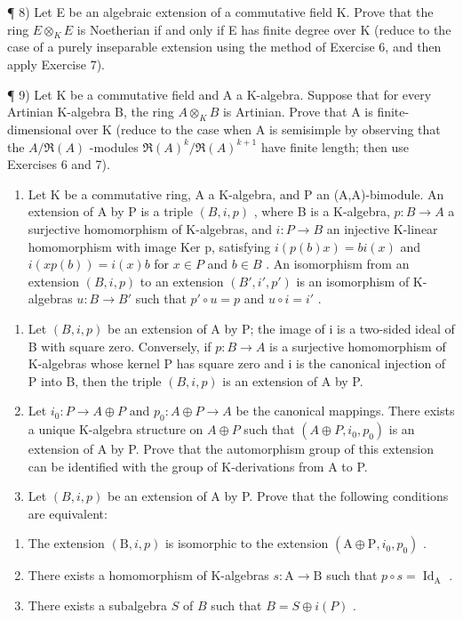 ¶ 8) Let E be an algebraic extension of a commutative field K. Prove that the ring \(E \otimes_{K} E\) is Noetherian if and only if E has finite degree over K (reduce to the case of a purely inseparable extension using the method of Exercise 6, and then apply Exercise 7).

¶ 9) Let K be a commutative field and A a K-algebra. Suppose that for every Artinian K-algebra B, the ring \(A \otimes_{K} B\) is Artinian. Prove that A is finite-dimensional over K (reduce to the case when A is semisimple by observing that the \(A/\Re(A)\) -modules \(\Re(A)^{k}/\Re(A)^{k+1}\) have finite length; then use Exercises 6 and 7).

\begin{enumerate}
\def\labelenumi{\arabic{enumi})}
\setcounter{enumi}{9}
\tightlist
\item
  Let K be a commutative ring, A a K-algebra, and P an (A,A)-bimodule. An extension of A by P is a triple \((B,i,p)\) , where B is a K-algebra, \(p:B\to A\) a surjective homomorphism of K-algebras, and \(i:P\to B\) an injective K-linear homomorphism with image Ker p, satisfying \(i(p(b)x)=bi(x)\) and \(i(xp(b))=i(x)b\) for \(x\in P\) and \(b\in B\) . An isomorphism from an extension \((B,i,p)\) to an extension \((B',i',p')\) is an isomorphism of K-algebras \(u:B\to B'\) such that \(p'\circ u=p\) and \(u\circ i=i'\) .
\end{enumerate}

\begin{enumerate}
\def\labelenumi{\alph{enumi})}
\item
  Let \((B, i, p)\) be an extension of A by P; the image of i is a two-sided ideal of B with square zero. Conversely, if \(p : B \to A\) is a surjective homomorphism of K-algebras whose kernel P has square zero and i is the canonical injection of P into B, then the triple \((B, i, p)\) is an extension of A by P.
\item
  Let \(i_{0}: P \to A \oplus P\) and \(p_{0}: A \oplus P \to A\) be the canonical mappings. There exists a unique K-algebra structure on \(A \oplus P\) such that \((A \oplus P, i_{0}, p_{0})\) is an extension of A by P. Prove that the automorphism group of this extension can be identified with the group of K-derivations from A to P.
\item
  Let \((B, i, p)\) be an extension of A by P. Prove that the following conditions are equivalent:
\end{enumerate}

\begin{enumerate}
\def\labelenumi{(\roman{enumi})}
\item
  The extension \((\mathrm{B},i,p)\) is isomorphic to the extension \((\mathrm{A}\oplus \mathrm{P},i_0,p_0)\) .
\item
  There exists a homomorphism of K-algebras \(s: \mathrm{A} \to \mathrm{B}\) such that \(p \circ s = \operatorname{Id}_{\mathrm{A}}\) .
\item
  There exists a subalgebra \(S\) of \(B\) such that \(B = S \oplus i(P)\) .
\end{enumerate}

